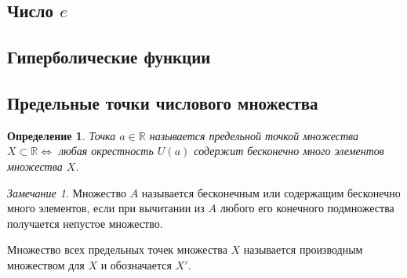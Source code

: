 \documentclass[a4paper,12pt]{article} %
\newtheorem{definition}{Определение}[subsection]
\theoremstyle{remark}
\newtheorem*{remark}{Замечание}
\begin{document}
\subsection{Число $e$}

\subsection{Гиперболические функции}
\subsection{Предельные точки числового множества}
\begin{definition}
	Точка $a\in \mathbb{R}$ называется предельной точкой множества $X\subset \mathbb{R} \iff$ любая окрестность $U(a)$ содержит бесконечно много элементов множества $X$.
\end{definition}
\begin{remark}
	Множество $A$ называется бесконечным или содержащим бесконечно много элементов, если при вычитании из $A$ любого его конечного подмножества получается непустое множество.
\end{remark}

Множество всех предельных точек множества $X$ называется производным множеством для $X$ и обозначается $X'$.
\end{document}
